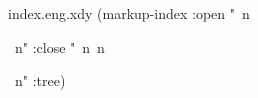  
 
 
\begin{filecontents*}{index.eng.xdy}
(markup-index :open  "~n
\begin{theindex}
  \providecommand*\lettergroupDefault[1]{}
  \providecommand*\lettergroup[1]{%
    \textit{#1}
    \nopagebreak
  }
  ~n"
  :close "~n~n\end{theindex}~n"
:tree)
\end{filecontents*}

